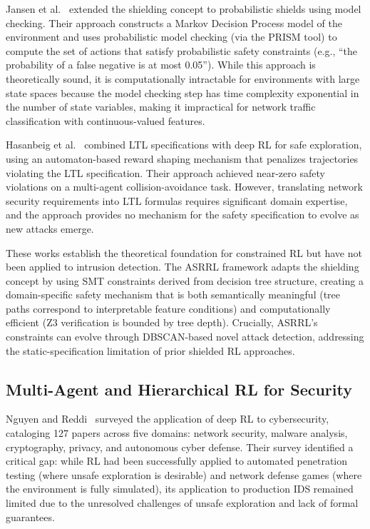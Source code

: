 \documentclass[12pt, letterpaper, oneside]{report}
\newcommand{\ASRRL}{\textsc{ASRRL}}
\begin{document}
Jansen et al.~\citep{jansen2020} extended the shielding concept to probabilistic shields using model checking. Their approach constructs a Markov Decision Process model of the environment and uses probabilistic model checking (via the PRISM tool) to compute the set of actions that satisfy probabilistic safety constraints (e.g., ``the probability of a false negative is at most 0.05''). While this approach is theoretically sound, it is computationally intractable for environments with large state spaces because the model checking step has time complexity exponential in the number of state variables, making it impractical for network traffic classification with continuous-valued features.

Hasanbeig et al.~\citep{hasanbeig2020} combined LTL specifications with deep RL for safe exploration, using an automaton-based reward shaping mechanism that penalizes trajectories violating the LTL specification. Their approach achieved near-zero safety violations on a multi-agent collision-avoidance task. However, translating network security requirements into LTL formulas requires significant domain expertise, and the approach provides no mechanism for the safety specification to evolve as new attacks emerge.

These works establish the theoretical foundation for constrained RL but have not been applied to intrusion detection. The \ASRRL{} framework adapts the shielding concept by using SMT constraints derived from decision tree structure, creating a domain-specific safety mechanism that is both semantically meaningful (tree paths correspond to interpretable feature conditions) and computationally efficient (Z3 verification is bounded by tree depth). Crucially, \ASRRL{}'s constraints can evolve through DBSCAN-based novel attack detection, addressing the static-specification limitation of prior shielded RL approaches.

\subsection{Multi-Agent and Hierarchical RL for Security}

Nguyen and Reddi~\citep{nguyen2021} surveyed the application of deep RL to cybersecurity, cataloging 127 papers across five domains: network security, malware analysis, cryptography, privacy, and autonomous cyber defense. Their survey identified a critical gap: while RL had been successfully applied to automated penetration testing (where unsafe exploration is desirable) and network defense games (where the environment is fully simulated), its application to production IDS remained limited due to the unresolved challenges of unsafe exploration and lack of formal guarantees.
\end{document}
